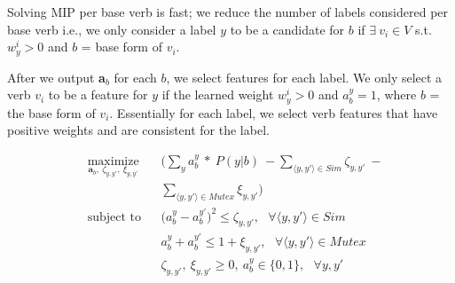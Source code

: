 Solving MIP per base verb is fast; we reduce the number of labels considered per base verb i.e., we only consider a label $y$ to be a candidate for $b$ if $\exists\ v_i \in V$ s.t. $w_y^i > 0$ and $b$ = base form of $v_i$. %

After we output \textbf{a}$_b$ for each $b$, we select features for each label. We only select a verb $v_i$ to be a feature for $y$ if the learned weight $w_y^i > 0$ and $a_b^{y} = 1$, where $b$ = the base form of $v_i$. Essentially for each label, we select verb features that have positive weights and are consistent for the label.

\scriptsize
\begin{equation}
\begin{aligned}
& \operatorname*{maximize}_{\textbf{a}_b,\ \zeta_{y, y'},\ \xi_{y, y'}} 
& & \bigg( \sum_{y} a_{b}^{y}\ *\ P(y | b)\ - \sum_{\langle y, y'\rangle \in Sim} \zeta_{y, y'}\ - \\
& & & \sum_{\langle y, y'\rangle \in Mutex} \xi_{y, y'}\bigg) \\ 
& \text{subject to} & & \big(a_{b}^{y} - a_{b}^{y'}\big)^2 \leq \zeta_{y, y'},\ \ \ \forall \langle y, y'\rangle \in Sim \\
& & & a_{b}^{y} + a_{b}^{y'} \leq 1 + \xi_{y, y'},\ \ \ \forall \langle y, y'\rangle \in Mutex \\
& & & \zeta_{y, y'},\ \xi_{y, y'} \geq 0,\ a_{b}^{y} \in \{0, 1\},\ \ \ \forall y, y'
\label{eqn:mip}
\end{aligned}
\end{equation}
\normalsize
